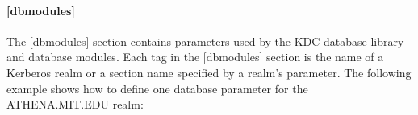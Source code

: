 \documentclass[letterpaper,10pt,english]{sphinxmanual}
\begin{document}
\paragraph{{[}dbmodules{]}}
\label{\detokenize{admin/conf_files/kdc_conf:dbmodules}}\label{\detokenize{admin/conf_files/kdc_conf:id3}}
\sphinxAtStartPar
The {[}dbmodules{]} section contains parameters used by the KDC database
library and database modules.  Each tag in the {[}dbmodules{]} section is
the name of a Kerberos realm or a section name specified by a realm’s
 parameter.  The following example shows how to
define one database parameter for the ATHENA.MIT.EDU realm:

\begin{sphinxVerbatim}[commandchars=\\\{\}]
\PYG{p}{[}\PYG{p}{]}
      
          
\end{sphinxVerbatim}
\end{document}
